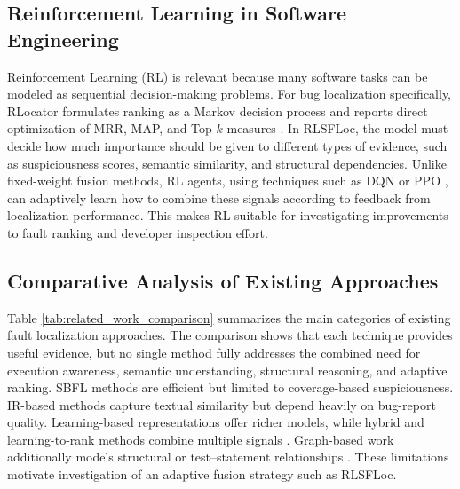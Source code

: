 \documentclass[article,article,submit,pdftex,moreauthors]{Definitions/mdpi}
\begin{document}
\subsection{Reinforcement Learning in Software Engineering}

Reinforcement Learning (RL) is relevant because many software tasks can be modeled as sequential decision-making problems. For bug localization specifically, RLocator formulates ranking as a Markov decision process and reports direct optimization of MRR, MAP, and Top-$k$ measures \cite{chakraborty2024rlocator}. In RLSFLoc, the model must decide how much importance should be given to different types of evidence, such as suspiciousness scores, semantic similarity, and structural dependencies. Unlike fixed-weight fusion methods, RL agents, using techniques such as DQN \cite{mnih2015dqn} or PPO \cite{schulman2017ppo}, can adaptively learn how to combine these signals according to feedback from localization performance. This makes RL suitable for investigating improvements to fault ranking and developer inspection effort.

\subsection{Comparative Analysis of Existing Approaches}

Table \ref{tab:related_work_comparison} summarizes the main categories of existing fault localization approaches. The comparison shows that each technique provides useful evidence, but no single method fully addresses the combined need for execution awareness, semantic understanding, structural reasoning, and adaptive ranking. SBFL methods are efficient but limited to coverage-based suspiciousness. IR-based methods capture textual similarity but depend heavily on bug-report quality. Learning-based representations offer richer models, while hybrid and learning-to-rank methods combine multiple signals \cite{xuan2014learning,le2016ltr,sohn2017fluccs,almhana2021hybrid}. Graph-based work additionally models structural or test--statement relationships \cite{zhang2017pagerank,lou2021grace}. These limitations motivate investigation of an adaptive fusion strategy such as RLSFLoc.
\end{document}
